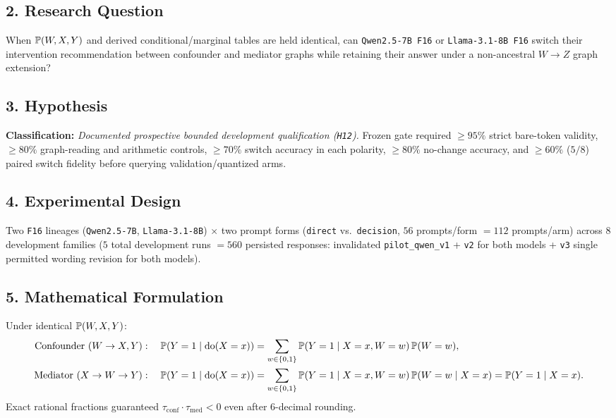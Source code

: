 \subsection*{2. Research Question}
When $\mathbb{P}(W,X,Y)$ and derived conditional/marginal tables are held identical, can \texttt{Qwen2.5-7B F16} or \texttt{Llama-3.1-8B F16} switch their intervention recommendation between confounder and mediator graphs while retaining their answer under a non-ancestral $W\to Z$ graph extension?

\subsection*{3. Hypothesis}
\textbf{Classification:} \emph{Documented prospective bounded development qualification (\texttt{H12}).} Frozen gate required $\ge 95\%$ strict bare-token validity, $\ge 80\%$ graph-reading and arithmetic controls, $\ge 70\%$ switch accuracy in each polarity, $\ge 80\%$ no-change accuracy, and $\ge 60\%$ ($5/8$) paired switch fidelity before querying validation/quantized arms.

\subsection*{4. Experimental Design}
Two \texttt{F16} lineages (\texttt{Qwen2.5-7B}, \texttt{Llama-3.1-8B}) $\times$ two prompt forms (\texttt{direct} vs.\ \texttt{decision}, $56$ prompts/form $= 112$ prompts/arm) across $8$ development families ($5$ total development runs $= 560$ persisted responses: invalidated \texttt{pilot\_qwen\_v1} + \texttt{v2} for both models + \texttt{v3} single permitted wording revision for both models).

\subsection*{5. Mathematical Formulation}
Under identical $\mathbb{P}(W,X,Y)$:
\begin{align}
  \text{Confounder } (W \to X,Y): \quad \mathbb{P}(Y=1\mid \operatorname{do}(X=x)) &= \sum_{w\in\{0,1\}} \mathbb{P}(Y=1\mid X=x, W=w)\,\mathbb{P}(W=w), \\
  \text{Mediator } (X \to W \to Y): \quad \mathbb{P}(Y=1\mid \operatorname{do}(X=x)) &= \sum_{w\in\{0,1\}} \mathbb{P}(Y=1\mid X=x, W=w)\,\mathbb{P}(W=w\mid X=x) = \mathbb{P}(Y=1\mid X=x).
\end{align}
Exact rational fractions guaranteed $\tau_{\mathrm{conf}} \cdot \tau_{\mathrm{med}} < 0$ even after 6-decimal rounding.

